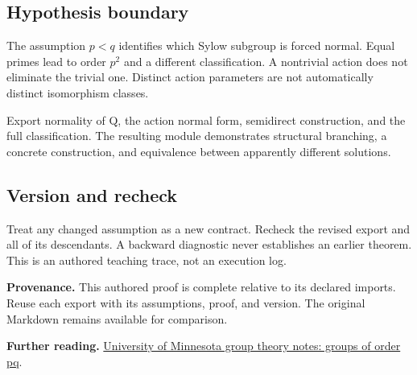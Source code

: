 \documentclass[preprint,12pt,aps,pra,showkeys,amsmath,amssymb,superscriptaddress,floatfix]{revtex4-2}
\theoremstyle{definition}
\theoremstyle{remark}
\begin{document}
\subsection{Hypothesis boundary}
The assumption \(p<q\) identifies which Sylow subgroup is forced normal.
Equal primes lead to order \(p^{2}\) and a different classification. A
nontrivial action does not eliminate the trivial one. Distinct action
parameters are not automatically distinct isomorphism classes.

Export normality of Q, the action normal form, semidirect construction,
and the full classification. The resulting module demonstrates
structural branching, a concrete construction, and equivalence between
apparently different solutions.

\subsection{Version and recheck}
Treat any changed assumption as a new contract. Recheck the revised
export and all of its descendants. A backward diagnostic never
establishes an earlier theorem. This is an authored teaching trace, not
an execution log.

\par\medskip\begingroup\small\linespread{1.0}\selectfont\noindent\textbf{Provenance.} This authored proof is complete relative to its declared imports. Reuse
each export with its assumptions, proof, and version. The original
Markdown remains available for comparison.
\par\endgroup

\par\smallskip\begingroup\small\linespread{1.0}\selectfont\noindent\textbf{Further reading.} \href{https://www-users.cse.umn.edu/~garrett/m/algebra/notes_2023-24/02.pdf}{University
of Minnesota group theory notes: groups of order pq}.\par\endgroup
\end{document}
